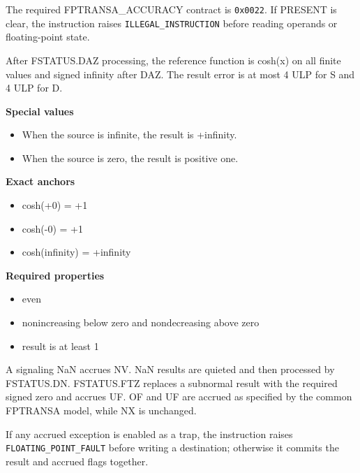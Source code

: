The required FPTRANSA\_ACCURACY contract is \texttt{0x0022}. If PRESENT is clear, the instruction raises \texttt{ILLEGAL\_INSTRUCTION} before reading operands or floating-point state.

After FSTATUS.DAZ processing, the reference function is cosh(x) on all finite values and signed infinity after DAZ. The result error is at most 4 ULP for S and 4 ULP for D.

\textbf{Special values}\par
\begin{itemize}
\item When the source is infinite, the result is +infinity.
\item When the source is zero, the result is positive one.
\end{itemize}

\textbf{Exact anchors}\par
\begin{itemize}
\item cosh(+0) = +1
\item cosh(-0) = +1
\item cosh(infinity) = +infinity
\end{itemize}

\textbf{Required properties}\par
\begin{itemize}
\item even
\item nonincreasing below zero and nondecreasing above zero
\item result is at least 1
\end{itemize}

A signaling NaN accrues NV. NaN results are quieted and then processed by FSTATUS.DN. FSTATUS.FTZ replaces a subnormal result with the required signed zero and accrues UF. OF and UF are accrued as specified by the common FPTRANSA model, while NX is unchanged.

If any accrued exception is enabled as a trap, the instruction raises \texttt{FLOATING\_POINT\_FAULT} before writing a destination; otherwise it commits the result and accrued flags together.
